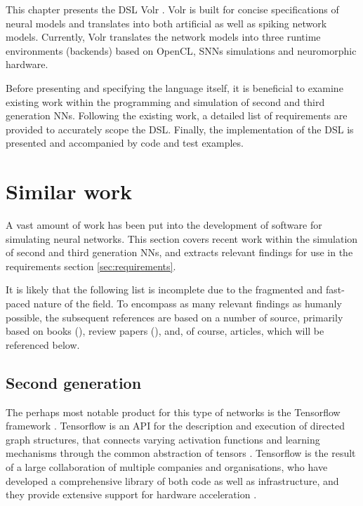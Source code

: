\documentclass[report.tex]{subfiles}
\begin{document}
This chapter presents the \gls{DSL} Volr .
Volr is built for concise specifications of 
neural models and translates into both artificial as well as
spiking network models.
Currently, Volr translates the network models into three runtime
environments (backends) based on \gls{OpenCL}, \glspl{SNN} simulations
and neuromorphic hardware.

Before presenting and specifying the language itself, 
it is beneficial to examine existing work within the
programming and simulation of second and third
generation \gls{NN}s.
Following the existing work, a detailed list of requirements
are provided to accurately scope the \gls{DSL}.
Finally, the implementation of the \gls{DSL} is presented and
accompanied by code and test examples.

\section{Similar work}
A vast amount of work has been put into the development of software for simulating
neural networks.
This section covers recent work within the simulation of second and third
generation \glspl{NN}, and extracts relevant findings for use in the
requirements section \ref{sec:requirements}.

It is likely that the following list is incomplete due to the fragmented and 
fast-paced nature of the field.
To encompass as many relevant findings as humanly possible, the subsequent
references are based on a number of source, primarily based on books
(\cite{Bishop2006, Russel2007, Eliasmith2015, Lin2018, Nilsson2009, Pearl1988, Rojas1996, Rumelhart1988}), review papers 
(\cite{Schmidhuber2014, Blundell2018, Markram2013, Walter2015, Hunsberger2015}),
and, of course, articles, which will be referenced below.

\subsection{Second generation}
The perhaps most notable product for this type of networks is the Tensorflow 
framework \cite{Abadi2016}.
Tensorflow is an \gls{API} for the description and execution of directed graph 
structures,
that connects varying activation functions and learning mechanisms through the common abstraction
of tensors \cite{Abadi2015}.
Tensorflow is the result of a large collaboration of multiple companies and organisations, who have
developed a comprehensive library of both code as well as infrastructure, and they
provide extensive support for hardware acceleration \cite{Abadi2015}.
\end{document}
